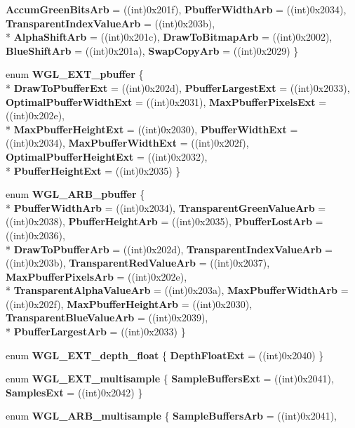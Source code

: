 \begin{DoxyCompactItemize}
{\bfseries Accum\-Green\-Bits\-Arb} = ((int)0x201f), 
{\bfseries Pbuffer\-Width\-Arb} = ((int)0x2034), 
{\bfseries Transparent\-Index\-Value\-Arb} = ((int)0x203b), 
\\*
{\bfseries Alpha\-Shift\-Arb} = ((int)0x201c), 
{\bfseries Draw\-To\-Bitmap\-Arb} = ((int)0x2002), 
{\bfseries Blue\-Shift\-Arb} = ((int)0x201a), 
{\bfseries Swap\-Copy\-Arb} = ((int)0x2029)
 \}
\item 
enum {\bfseries W\-G\-L\-\_\-\-E\-X\-T\-\_\-pbuffer} \{ \\*
{\bfseries Draw\-To\-Pbuffer\-Ext} = ((int)0x202d), 
{\bfseries Pbuffer\-Largest\-Ext} = ((int)0x2033), 
{\bfseries Optimal\-Pbuffer\-Width\-Ext} = ((int)0x2031), 
{\bfseries Max\-Pbuffer\-Pixels\-Ext} = ((int)0x202e), 
\\*
{\bfseries Max\-Pbuffer\-Height\-Ext} = ((int)0x2030), 
{\bfseries Pbuffer\-Width\-Ext} = ((int)0x2034), 
{\bfseries Max\-Pbuffer\-Width\-Ext} = ((int)0x202f), 
{\bfseries Optimal\-Pbuffer\-Height\-Ext} = ((int)0x2032), 
\\*
{\bfseries Pbuffer\-Height\-Ext} = ((int)0x2035)
 \}
\item 
enum {\bfseries W\-G\-L\-\_\-\-A\-R\-B\-\_\-pbuffer} \{ \\*
{\bfseries Pbuffer\-Width\-Arb} = ((int)0x2034), 
{\bfseries Transparent\-Green\-Value\-Arb} = ((int)0x2038), 
{\bfseries Pbuffer\-Height\-Arb} = ((int)0x2035), 
{\bfseries Pbuffer\-Lost\-Arb} = ((int)0x2036), 
\\*
{\bfseries Draw\-To\-Pbuffer\-Arb} = ((int)0x202d), 
{\bfseries Transparent\-Index\-Value\-Arb} = ((int)0x203b), 
{\bfseries Transparent\-Red\-Value\-Arb} = ((int)0x2037), 
{\bfseries Max\-Pbuffer\-Pixels\-Arb} = ((int)0x202e), 
\\*
{\bfseries Transparent\-Alpha\-Value\-Arb} = ((int)0x203a), 
{\bfseries Max\-Pbuffer\-Width\-Arb} = ((int)0x202f), 
{\bfseries Max\-Pbuffer\-Height\-Arb} = ((int)0x2030), 
{\bfseries Transparent\-Blue\-Value\-Arb} = ((int)0x2039), 
\\*
{\bfseries Pbuffer\-Largest\-Arb} = ((int)0x2033)
 \}
\item 
enum {\bfseries W\-G\-L\-\_\-\-E\-X\-T\-\_\-depth\-\_\-float} \{ {\bfseries Depth\-Float\-Ext} = ((int)0x2040)
 \}
\item 
enum {\bfseries W\-G\-L\-\_\-\-E\-X\-T\-\_\-multisample} \{ {\bfseries Sample\-Buffers\-Ext} = ((int)0x2041), 
{\bfseries Samples\-Ext} = ((int)0x2042)
 \}
\item 
enum {\bfseries W\-G\-L\-\_\-\-A\-R\-B\-\_\-multisample} \{ {\bfseries Sample\-Buffers\-Arb} = ((int)0x2041), 

\end{DoxyCompactItemize}
